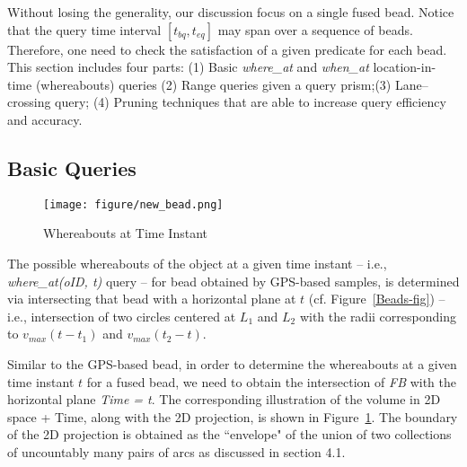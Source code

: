 Without losing the generality, our discussion focus on a single fused bead.
Notice that the query time interval $[t_{bq},t_{eq}]$ may span over a sequence of beads.
Therefore, one need to check the satisfaction of a given predicate for each bead. This section includes four parts: (1) Basic {\it where\_at} and {\it when\_at} location-in-time (whereabouts) queries (2)
Range queries given a query prism;(3) Lane--crossing query; (4) Pruning techniques that are able to increase
query efficiency and accuracy.
\subsection{Basic Queries}
\begin{figure}
    \centering
    \texttt{[image: figure/new\_bead.png]}
    \caption{Whereabouts at Time Instant}
    \label{fusing:bead}
\end{figure}
The possible whereabouts of the object at a given time instant -- i.e., {\it where\_at(oID, t)} query -- for bead obtained by GPS-based samples, is determined via intersecting that bead with a horizontal plane at $t$ (cf. Figure~\ref{Beads-fig}) -- i.e., intersection of two circles centered at $L_1$ and $L_2$ with the radii corresponding to $v_{max}(t - t_1)$ and $v_{max}(t_2 - t)$. 




Similar to the GPS-based bead, in order to determine the whereabouts at a given time instant $t$ for a fused bead, we need to 
obtain the intersection of {\it FB} with the horizontal plane {\it Time = t}. 
The corresponding illustration of the volume in 2D space + Time, along with the 2D projection, is shown in Figure~\ref{fusing:bead}. The boundary of the 2D projection is obtained as the ``envelope" of the union of two collections of uncountably many pairs of arcs
as discussed in section 4.1.

